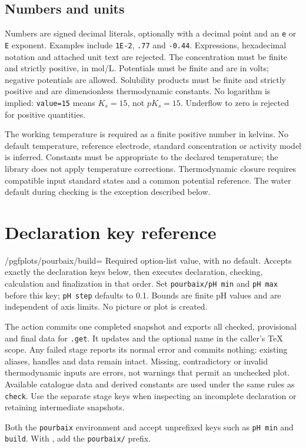 \documentclass[a4paper,11pt]{ltxdoc}
\begin{document}
\subsection{Numbers and units}
Numbers are signed decimal literals, optionally with a decimal point and an
\texttt{e} or \texttt{E} exponent. Examples include \texttt{1E-2}, \texttt{.77} and
\texttt{-0.44}. Expressions, hexadecimal notation and attached unit text are
rejected. The concentration must be finite and strictly positive, in mol/L.
Potentials must be finite and are in volts; negative potentials are allowed.
Solubility products must be finite and strictly positive and are dimensionless
thermodynamic constants. No logarithm is implied: \texttt{value=15} means $K_s=15$,
not $pK_s=15$. Underflow to zero is rejected for positive quantities.

The working temperature is required as a finite positive number in kelvins.
No default temperature, reference electrode, standard concentration or activity
model is inferred. Constants must be appropriate to the declared temperature;
the library does not apply temperature corrections. Thermodynamic closure
requires compatible input standard states and a common potential reference.
The water default during checking is the exception described below.

\section{Declaration key reference}


\begin{key}{/pgfplots/pourbaix/build=}
Required option-list value, with no default. Accepts exactly the declaration
keys below, then executes declaration, checking, calculation and finalization
in that order. Set \texttt{pourbaix/pH min} and \texttt{pH max} before this key;
\texttt{pH step} defaults to 0.1. Bounds are finite pH values and are independent
of axis limits. No picture or plot is created.

The action commits one completed snapshot and exports all checked, provisional
and final data for \texttt{.get}. It updates  and the
optional name in the caller's TeX scope. Any failed stage reports its normal
error and commits nothing: existing aliases, handles and data remain intact.
Missing, contradictory or invalid thermodynamic inputs are errors, not warnings
that permit an unchecked plot. Available catalogue data and derived constants
are used under the same rules as \texttt{check}. Use the separate stage keys
when inspecting an incomplete declaration or retaining intermediate snapshots.

Both the \texttt{pourbaix} environment and  accept
unprefixed keys such as \texttt{pH min} and \texttt{build}.
With , add the \texttt{pourbaix/} prefix.
\end{key}
\end{document}
